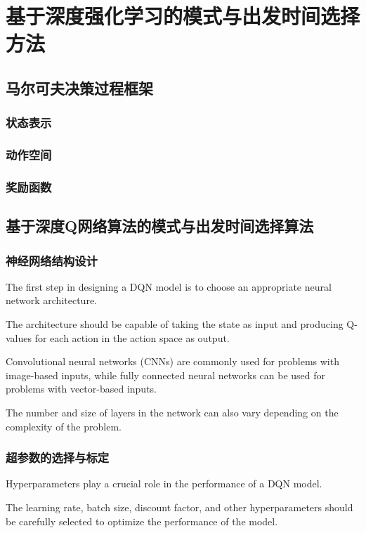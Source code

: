 \chapter{基于深度强化学习的模式与出发时间选择方法}
\label{chp:float}

\section{马尔可夫决策过程框架}
\subsection{状态表示}
\subsection{动作空间}
\subsection{奖励函数}

\section{基于深度Q网络算法的模式与出发时间选择算法}

\subsection{神经网络结构设计}

The first step in designing a DQN model is to choose an appropriate neural network architecture.

The architecture should be capable of taking the state as input and producing Q-values for each action in the action space as output.

Convolutional neural networks (CNNs) are commonly used for problems with image-based inputs, while fully connected neural networks can be used for problems with vector-based inputs.

The number and size of layers in the network can also vary depending on the complexity of the problem.

\subsection{超参数的选择与标定}

Hyperparameters play a crucial role in the performance of a DQN model.

The learning rate, batch size, discount factor, and other hyperparameters should be carefully selected to optimize the performance of the model.

